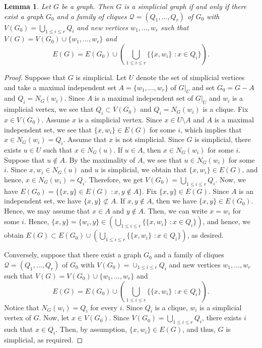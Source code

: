 \documentclass[12pt]{amsart}
\newtheorem{lemma}[thm]{Lemma}
\theoremstyle{definition}
\theoremstyle{remark}
\begin{document}
\begin{lemma}\label{structure of simplicial graphs}
Let $G$ be a graph. Then $G$ is a simplicial graph if and only if there exist a graph $G_{0}$ and a family of cliques $\mathcal{Q}=(Q_{1},\ldots, Q_{r})$ of $G_{0}$ with $V(G_{0})=\bigcup_{1\leq i\leq r}Q_{i}$ and new vertices $w_{1},\ldots, w_{r}$ such that $V(G)=V(G_{0})\cup\{w_{1},\ldots, w_{r}\}$ and 
$$E(G)=E(G_{0})\cup\left(\bigcup_{1\leq i\leq r}\{\{x,w_{i}\}\,\,: x\in Q_{i}\}\right).$$
\end{lemma}
\begin{proof}
Suppose that $G$ is simplicial. Let $U$ denote the set of simplicial vertices and take a maximal independent set $A=\{w_{1},\ldots, w_{r}\}$ of $G|_{U}$ and set $G_{0}=G-A$ and $Q_{i}=N_{G}(w_{i})$. Since $A$ is a maximal independent set of $G|_{U}$ and $w_{i}$ is a simplicial vertex, we see that $Q_{i}\subset V(G_{0})$ and $Q_{i}=N_{G}(w_{i})$ is a clique. Fix $x\in V(G_{0})$. Assume $x$ is a simplicial vertex. Since $x\in U\setminus A$ and $A$ is a maximal independent set, we see that $\{x,w_{i}\}\in E(G)$ for some $i$, which implies that $x\in N_{G}(w_{i})=Q_{i}$. Assume that $x$ is not simplicial. Since $G$ is simplicial, there exists $u\in U$ such that $x\in N_{G}(u)$. If $u\in A$, then $x\in N_{G}(w_{i})$ for some $i$. Suppose that $u\notin A$. By the maximality of $A$, we see that $u\in N_{G}(w_{i})$ for some $i$. Since $x, w_{i}\in N_{G}(u)$ and $u$ is simplicial, we obtain that $\{x,w_{i}\}\in E(G)$, and hence, $x\in N_{G}(w_{i})=Q_{i}$. Therefore, we get $V(G_{0})=\bigcup_{1\leq i\leq r}Q_{i}$. Now, we have $E(G_{0})=\{\{x,y\}\in E(G)\,\,: x,y\notin A\}$. Fix $\{x,y\}\in E(G)$. Since $A$ is an independent set, we have $\{x,y\}\not\subset A$. If $x,y\notin A$, then we have $\{x,y\}\in E(G_{0})$. Hence, we may assume that $x\in A$ and $y\notin A$. Then, we can write $x=w_{i}$ for some $i$. Hence, $\{x,y\}=\{w_{i},y\}\in(\bigcup_{1\leq i\leq r}\{\{x,w_{i}\}\,\,: x\in Q_{i}\})$, and hence, we obtain $E(G)\subset E(G_{0})\cup\left(\bigcup_{1\leq i\leq r}\{\{x,w_{i}\}\,\,: x\in Q_{i}\}\right)$, as desired. 

Conversely, suppose that there exist a graph $G_{0}$ and a family of cliques $\mathcal{Q}=(Q_{1},\ldots, Q_{r})$ of $G_{0}$ with $V(G_{0})=\cup_{1\leq i\leq r}Q_{i}$ and new vertices $w_{1},\ldots, w_{r}$ such that $V(G)=V(G_{0})\cup\{w_{1},\ldots, w_{r}\}$ and 
$$E(G)=E(G_{0})\cup\left(\bigcup_{1\leq i\leq r}\{\{x,w_{i}\}\,\,: x\in Q_{i}\}\right).$$Notice that $N_{G}(w_{i})=Q_{i}$ for every $i$. Since $Q_{i}$ is a clique, $w_{i}$ is a simplicial vertex of $G$. 
Now, let $x\in V(G_{0})$. Since $V(G_{0})=\bigcup_{1\leq i\leq r}Q_{i}$, there exists $i$ such that $x\in Q_{i}$. Then, by assumption, $\{x, w_{i}\}\in E(G)$, and thus, $G$ is simplicial, as required. 
\end{proof}
\end{document}
